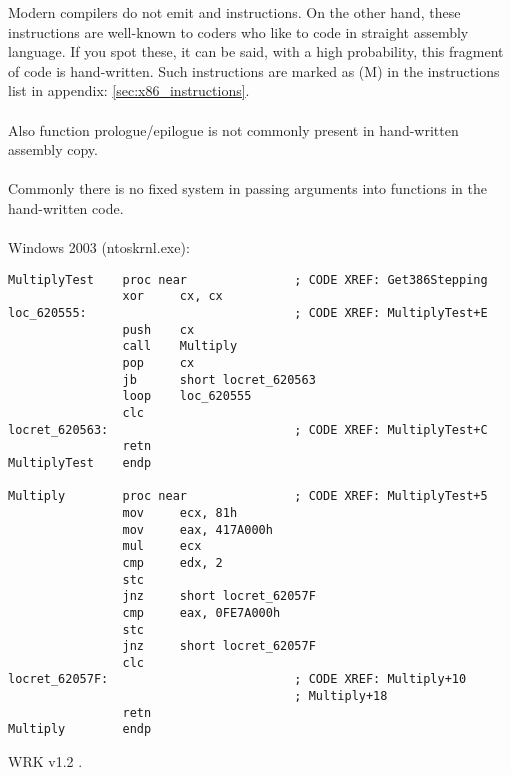 {Modern compilers do not emit  and  instructions.
On the other hand, these instructions are well-known to coders who like to code in straight assembly language.
If you spot these, it can be said, with a high probability, this fragment of code is hand-written.
Such instructions are marked as (M) in the instructions list in appendix: \ref{sec:x86_instructions}.}\\
\\
{Also function prologue/epilogue is not commonly present in hand-written assembly copy.}\\
\\
{Commonly there is no fixed system in passing arguments into functions in the hand-written
code}.\\
\\
 Windows 2003 
(ntoskrnl.exe):

\begin{lstlisting}
MultiplyTest    proc near               ; CODE XREF: Get386Stepping
                xor     cx, cx
loc_620555:                             ; CODE XREF: MultiplyTest+E
                push    cx
                call    Multiply
                pop     cx
                jb      short locret_620563
                loop    loc_620555
                clc
locret_620563:                          ; CODE XREF: MultiplyTest+C
                retn
MultiplyTest    endp

Multiply        proc near               ; CODE XREF: MultiplyTest+5
                mov     ecx, 81h
                mov     eax, 417A000h
                mul     ecx
                cmp     edx, 2
                stc
                jnz     short locret_62057F
                cmp     eax, 0FE7A000h
                stc
                jnz     short locret_62057F
                clc
locret_62057F:                          ; CODE XREF: Multiply+10
                                        ; Multiply+18
                retn
Multiply        endp
\end{lstlisting}

\ac{WRK} v1.2 
.
